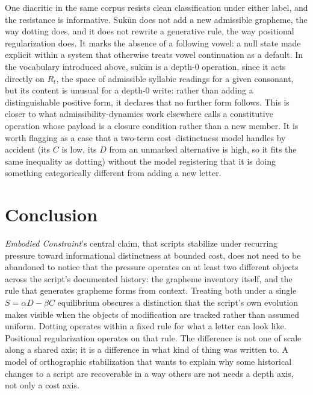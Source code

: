\documentclass[11pt]{article}
\begin{document}
One diacritic in the same corpus resists clean classification under either
label, and the resistance is informative. Sukūn does not add a new
admissible grapheme, the way dotting does, and it does not rewrite a
generative rule, the way positional regularization does. It marks the
absence of a following vowel: a null state made explicit within a system
that otherwise treats vowel continuation as a default. In the vocabulary
introduced above, sukūn is a depth-0 operation, since it acts directly on
$R_t$, the space of admissible syllabic readings for a given consonant, but
its content is unusual for a depth-0 write: rather than adding a
distinguishable positive form, it declares that no further form follows.
This is closer to what admissibility-dynamics work elsewhere calls a
constitutive operation whose payload is a closure condition rather than a
new member. It is worth flagging as a case that a two-term cost--distinctness
model handles by accident (its $C$ is low, its $D$ from an unmarked
alternative is high, so it fits the same inequality as dotting) without the
model registering that it is doing something categorically different from
adding a new letter.

\section{Conclusion}

\emph{Embodied Constraint}'s central claim, that scripts stabilize under
recurring pressure toward informational distinctness at bounded cost, does
not need to be abandoned to notice that the pressure operates on at least
two different objects across the script's documented history: the grapheme
inventory itself, and the rule that generates grapheme forms from context.
Treating both under a single $S = \alpha D - \beta C$ equilibrium obscures a
distinction that the script's own evolution makes visible when the objects
of modification are tracked rather than assumed uniform. Dotting operates
within a fixed rule for what a letter can look like. Positional
regularization operates on that rule. The difference is not one of scale
along a shared axis; it is a difference in what kind of thing was written
to. A model of orthographic stabilization that wants to explain why some
historical changes to a script are recoverable in a way others are not needs
a depth axis, not only a cost axis.
\end{document}
